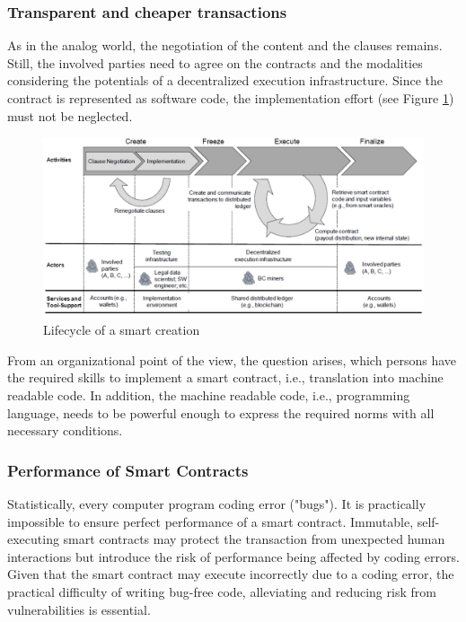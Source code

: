 \subsubsection{Transparent and cheaper transactions}
As in the analog world, the negotiation of the
content and the clauses remains. Still, the involved parties need to agree on the contracts and
the modalities considering the potentials of a decentralized execution infrastructure.
Since the contract is represented as software code, the implementation effort (see Figure \ref{fig:smartcontractcreation})
must not be neglected.
\begin{figure}[H]
	\centering
	\includegraphics[width=1\linewidth]{Images/smartContractCreation}
	\caption{Lifecycle of a smart creation \cite{Sillaber2017}}
	\label{fig:smartcontractcreation}
\end{figure}

 From an organizational point of the view, the question arises, which
persons have the required skills to implement
a \gls{smart contract}, i.e., translation into machine readable code. In addition, the machine readable
code, i.e., programming language, needs to be powerful enough to express the required norms
with all necessary conditions.


\subsubsection{Performance of Smart Contracts}
Statistically, every computer program coding error ("bugs"). It is practically impossible to ensure perfect performance of a \gls{smart contract}. Immutable, self-executing smart contracts may protect  
the transaction from unexpected human interactions but introduce the risk of
performance being affected by coding errors. Given that the smart contract may execute incorrectly due to a coding error, the practical difficulty of writing bug-free code, alleviating and reducing risk from vulnerabilities is essential.


